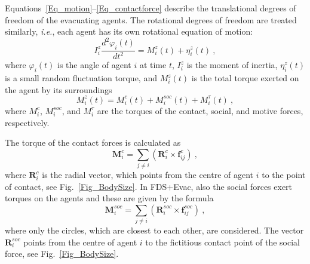 \documentclass[12pt,a4paper,final,twoside]{stylevk}
\begin{document}
Equations~\ref{Eq_motion}--\ref{Eq_contactforce} describe the
translational degrees of freedom of the evacuating agents.  The
rotational degrees of freedom are treated similarly, \emph{i.e.}, each
agent has its own rotational equation of motion:
%
\begin{equation}\label{Eq_rotmotion}
   I^z_{i} \frac{d^2 \varphi_i (t)}{dt^2} = {M}^z_{i} (t)  +
  {\eta}^z_{i} (t) ~,  
\end{equation}
%
where $\varphi_i(t)$ is the angle of agent $i$ at time $t$,
$I^z_{i}$ is the moment of inertia, ${\eta}^z_{i} (t)$ is a small
random fluctuation torque, and ${M}^z_{i} (t)$ is the total torque
exerted on the agent by its surroundings
%
\begin{equation}\label{Eq_total_torque}
  {M}^z_{i} (t) =  {M}^c_{i} (t) + {M}^{soc}_{i} (t) +  {M}^{\tau}_{i}
  (t) ~,
\end{equation}
%
where ${M}^c_{i}$, ${M}^{soc}_{i}$, and ${M}^{\tau}_{i}$ are the
torques of the contact, social, and motive forces, respectively.


The torque of the contact forces is calculated as
%
\begin{equation}\label{Eq_fc_torque}
  \mathbf{M}^c_{i} = \sum_{j \ne i} \left( \mathbf{R}^c_{i} \times
  \mathbf{f}_{ij}^{c} \right) ~, 
\end{equation}
%
where $\mathbf{R}^c_{i}$ is the radial vector, which points from the
centre of agent $i$ to the point of contact, see
Fig.~\ref{Fig_BodySize}.  In FDS+Evac, also the social forces exert
torques on the agents and these are given by the formula
%
\begin{equation}\label{Eq_soc_torque}
  \mathbf{M}^{soc}_{i} =  \sum_{j \ne i} \left( \mathbf{R}^{soc}_{i}
  \times \mathbf{f}_{ij}^{soc} \right) ~,
\end{equation}
%
where only the circles, which are closest to each other, are
considered.  The vector $\mathbf{R}^{soc}_{i}$ points from the centre
of agent $i$ to the fictitious contact point of the social force, see
Fig.~\ref{Fig_BodySize}.
\end{document}
